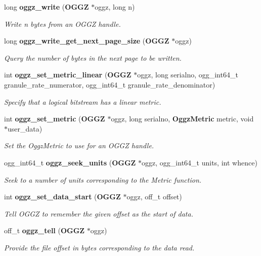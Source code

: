 \begin{CompactItemize}
long {\bf oggz\_\-write} ({\bf OGGZ} $\ast$oggz, long n)
\begin{CompactList}\small\item\em Write n bytes from an OGGZ handle. \item\end{CompactList}\item 
long {\bf oggz\_\-write\_\-get\_\-next\_\-page\_\-size} ({\bf OGGZ} $\ast$oggz)
\begin{CompactList}\small\item\em Query the number of bytes in the next page to be written. \item\end{CompactList}\item 
int {\bf oggz\_\-set\_\-metric\_\-linear} ({\bf OGGZ} $\ast$oggz, long serialno, ogg\_\-int64\_\-t granule\_\-rate\_\-numerator, ogg\_\-int64\_\-t granule\_\-rate\_\-denominator)
\begin{CompactList}\small\item\em Specify that a logical bitstream has a linear metric. \item\end{CompactList}\item 
int {\bf oggz\_\-set\_\-metric} ({\bf OGGZ} $\ast$oggz, long serialno, {\bf Oggz\-Metric} metric, void $\ast$user\_\-data)
\begin{CompactList}\small\item\em Set the Oggz\-Metric to use for an OGGZ handle. \item\end{CompactList}\item 
ogg\_\-int64\_\-t {\bf oggz\_\-seek\_\-units} ({\bf OGGZ} $\ast$oggz, ogg\_\-int64\_\-t units, int whence)
\begin{CompactList}\small\item\em Seek to a number of units corresponding to the Metric function. \item\end{CompactList}\item 
int {\bf oggz\_\-set\_\-data\_\-start} ({\bf OGGZ} $\ast$oggz, off\_\-t offset)
\begin{CompactList}\small\item\em Tell OGGZ to remember the given offset as the start of data. \item\end{CompactList}\item 
off\_\-t {\bf oggz\_\-tell} ({\bf OGGZ} $\ast$oggz)
\begin{CompactList}\small\item\em Provide the file offset in bytes corresponding to the data read. \item\end{CompactList}\item 

\end{CompactItemize}
